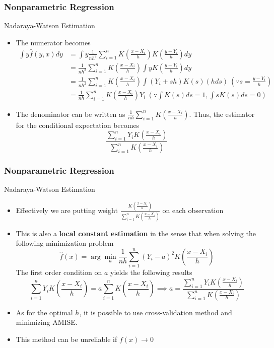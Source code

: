 \documentclass{beamer}
\begin{document}
\begin{frame}
\frametitle{Nonparametric Regression}
Nadaraya-Watson Estimation
\begin{itemize}
\item  The numerator becomes
 \footnotesize{\begin{align*}
 \int y \hat{f}(y,x)dy&=\int y \frac{1}{nh^2}\sum_{i=1}^n K\left(\frac{x-X_i}{h}\right)K\left(\frac{y-Y_i}{h}\right)dy\\
 &= \frac{1}{nh^2}\sum_{i=1}^n K\left(\frac{x-X_i}{h}\right)\int yK\left(\frac{y-Y_i}{h}\right)dy\\
 &=\frac{1}{nh^2}\sum_{i=1}^n K\left(\frac{x-X_i}{h}\right)\int (Y_i+sh)K\left(s\right)(hds) \ (\because s=\frac{y-Y_i}{h})\\
 &= \frac{1}{nh}\sum_{i=1}^n K\left(\frac{x-X_i}{h}\right)Y_i\ (\because \int K(s)ds=1, \int sK(s)ds=0)
 \end{align*}}\normalsize
 \item The denominator can be written as $ \frac{1}{nh}\sum_{i=1}^n K\left(\frac{x-X_i}{h}\right)$. Thus, the estimator for the conditional expectation becomes
 \[
 \frac{\sum_{i=1}^n Y_iK\left(\frac{x-X_i}{h}\right)}{\sum_{i=1}^n K\left(\frac{x-X_i}{h}\right)}
 \]
\end{itemize}
\end{frame}

\begin{frame}
\frametitle{Nonparametric Regression}
Nadaraya-Watson Estimation
\begin{itemize}
\item  Effectively we are putting weight $\frac{K\left(\frac{x-X_i}{h}\right)}{\sum_{i=1}^nK\left(\frac{x-X_i}{h}\right)}$ on each observation 
\item This is also a \textbf{local constant estimation} in the sense that when solving the following minimization problem
 \[
 \hat{f}(x)=\arg\min_a\frac{1}{nh}\sum_{i=1}^n(Y_i-a)^2K\left(\frac{x-X_i}{h}\right)
 \]
 The first order condition on $a$ yields the following results
 \[
 \sum_{i=1}^nY_iK\left(\frac{x-X_i}{h}\right)=a\sum_{i=1}^nK\left(\frac{x-X_i}{h}\right) \implies a= \frac{\sum_{i=1}^n Y_iK\left(\frac{x-X_i}{h}\right)}{\sum_{i=1}^n K\left(\frac{x-X_i}{h}\right)}
 \]
\item  As for the optimal $h$, it is possible to use cross-validation method and minimizing AMISE. 
\item This method can be unreliable if $f(x)\to0$
\end{itemize}
\end{frame}
\end{document}
